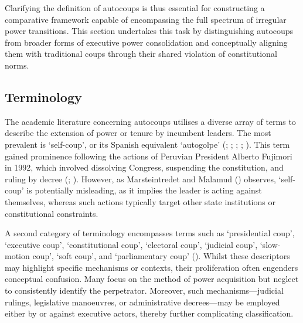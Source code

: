 \documentclass[
  12pt,
]{report}
\begin{document}
Clarifying the definition of autocoups is thus essential for
constructing a comparative framework capable of encompassing the full
spectrum of irregular power transitions. This section undertakes this
task by distinguishing autocoups from broader forms of executive power
consolidation and conceptually aligning them with traditional coups
through their shared violation of constitutional norms.

\subsection*{Terminology}\label{terminology}

The academic literature concerning autocoups utilises a diverse array of
terms to describe the extension of power or tenure by incumbent leaders.
The most prevalent is `self-coup', or its Spanish equivalent `autogolpe'
(;
;
; ; ). This term gained prominence following the actions of Peruvian
President Alberto Fujimori in 1992, which involved dissolving Congress,
suspending the constitution, and ruling by decree
(;
). However, as
Marsteintredet and Malamud ()
observes, `self-coup' is potentially misleading, as it implies the
leader is acting against themselves, whereas such actions typically
target other state institutions or constitutional constraints.

A second category of terminology encompasses terms such as `presidential
coup', `executive coup', `constitutional coup', `electoral coup',
`judicial coup', `slow-motion coup', `soft coup', and `parliamentary
coup' (). Whilst these descriptors may highlight specific mechanisms or
contexts, their proliferation often engenders conceptual confusion. Many
focus on the method of power acquisition but neglect to consistently
identify the perpetrator. Moreover, such mechanisms---judicial rulings,
legislative manoeuvres, or administrative decrees---may be employed
either by or against executive actors, thereby further complicating
classification.
\end{document}
